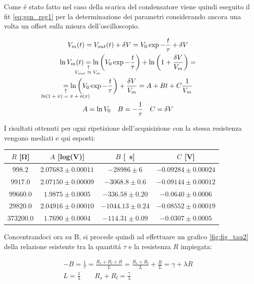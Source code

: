 \documentclass{article}
\newcommand{\equalexpl}[1]{
	\underset{\substack{\uparrow\\\mathrlap{\text{#1}}}}{=}}
\begin{document}
Come \'e stato fatto nel caso della scarica del condensatore viene quindi eseguito il fit \ref{eq:gen_reg1} per la determinazione dei parametri considerando ancora una volta un offset sulla misura dell'oscilloscopio.

\begin{gather}
	\nonumber
	V_m(t) = V_{out}(t) + \delta V =  V_0 \exp{ -\frac{t}{\tau} } + \delta V
	\\
	\nonumber
	\ln{V_m(t)} \equalexpl{\hspace{-2.5em}$V_{out} \approx V_m$} 
	\ln{\left( V_0 \exp{ -\frac{t}{\tau} } \right) } + 
	\ln{\left( 1 + \frac {\delta V}{V_{m}} \right) } = 
	\\
	\nonumber
	\equalexpl{\hspace{-4.5em}$\ln(1+x) = x + o(x)$} 
	\ln{\left( V_0 \exp{ -\frac{t}{\tau} } \right) } + 
	\frac {\delta V}{V_m} = A + B t + C\frac{1}{V_m}
	\\
	A = \ln{V_0} \quad B = -\frac{1}{\tau} \quad C = \delta V
	\label{eq:gen_reg1}
\end{gather}

I risultati ottenuti per ogni ripetizione dell'acquisizione con la stessa resistenza vengono mediati e qui esposti: 

\begin{center}
\begin{tabular}{c|c c c} 
	$R$ [\si{\ohm}] & $A$ [log(\si{\volt})] & $B$ [\si{\per\second}] & $C$ [\si{\volt}] \\
	[0.5ex]
	\hline
	$ 998.2 $&$ 2.07683\pm 0.00011 $&$ -28986\pm 6 $&$ -0.09284\pm 0.00024 $\\
	$ 9917.0 $&$ 2.07150\pm 0.00009 $&$ -3068.8\pm 0.6 $&$ -0.09144\pm 0.00012 $\\
	$ 99660.0 $&$ 1.9875\pm 0.0005 $&$ -336.58\pm 0.20 $&$ -0.0640\pm 0.0006 $\\
	$ 29820.0 $&$ 2.04916\pm 0.00010 $&$ -1044.13\pm 0.24 $&$ -0.08552\pm 0.00019 $\\
	$ 373200.0 $&$ 1.7690\pm 0.0004 $&$ -114.31\pm 0.09 $&$ -0.0307\pm 0.0005 $\\
\end{tabular}
\end{center}

Concentrandoci ora su B, si procede quindi ad effettuare un grafico \ref{fig:fig_tau2} della relazione esistente tra la quantit\'a $\tau$ e la resistenza $R$ impiegata:

\begin{gather}
	- B = \frac{1}{\tau} = \frac{R_s + R_l + R}{L}= \frac{R_s + R_l}{L} + \frac{R}{L} = \gamma + \lambda R 
	\label{eq:tauind} \\
	\nonumber
	L = \frac{1}{\lambda} \qquad R_s + R_l = \frac{\gamma}{\lambda}
\end{gather}
\end{document}
